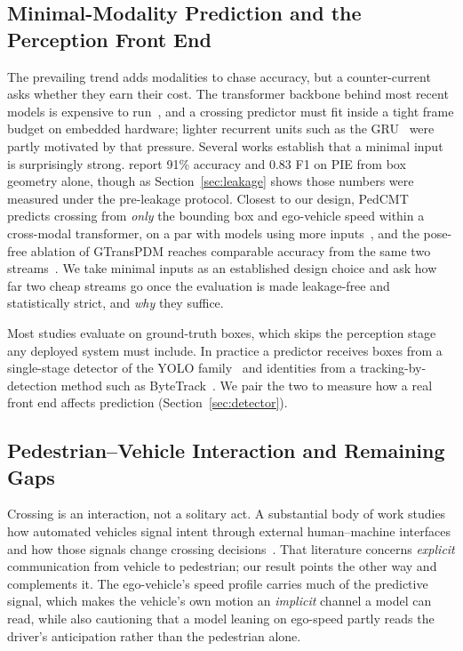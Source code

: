 \documentclass[mti,article,submit,moreauthors]{Definitions/mdpi}
\begin{document}
\subsection{Minimal-Modality Prediction and the Perception Front End}

The prevailing trend adds modalities to chase accuracy, but a counter-current asks whether they earn their cost. The transformer backbone behind most recent models is expensive to run~\citep{vaswani2017attention}, and a crossing predictor must fit inside a tight frame budget on embedded hardware; lighter recurrent units such as the GRU~\citep{cho2014gru} were partly motivated by that pressure. Several works establish that a minimal input is surprisingly strong. \citet{achaji2022attention} report 91\% accuracy and 0.83 F1 on PIE from box geometry alone, though as Section~\ref{sec:leakage} shows those numbers were measured under the pre-leakage protocol. Closest to our design, PedCMT predicts crossing from \emph{only} the bounding box and ego-vehicle speed within a cross-modal transformer, on a par with models using more inputs~\citep{chen2024pedcmt}, and the pose-free ablation of GTransPDM reaches comparable accuracy from the same two streams~\citep{xie2025gtranspdm}. We take minimal inputs as an established design choice and ask how far two cheap streams go once the evaluation is made leakage-free and statistically strict, and \emph{why} they suffice.

Most studies evaluate on ground-truth boxes, which skips the perception stage any deployed system must include. In practice a predictor receives boxes from a single-stage detector of the YOLO family~\citep{jocher2025yolo} and identities from a tracking-by-detection method such as ByteTrack~\citep{zhang2022bytetrack}. We pair the two to measure how a real front end affects prediction (Section~\ref{sec:detector}).

\subsection{Pedestrian--Vehicle Interaction and Remaining Gaps}

Crossing is an interaction, not a solitary act. A substantial body of work studies how automated vehicles signal intent through external human--machine interfaces and how those signals change crossing decisions~\citep{alhawiti2024ehmi,rezwana2024interactions}. That literature concerns \emph{explicit} communication from vehicle to pedestrian; our result points the other way and complements it. The ego-vehicle's speed profile carries much of the predictive signal, which makes the vehicle's own motion an \emph{implicit} channel a model can read, while also cautioning that a model leaning on ego-speed partly reads the driver's anticipation rather than the pedestrian alone.
\end{document}
